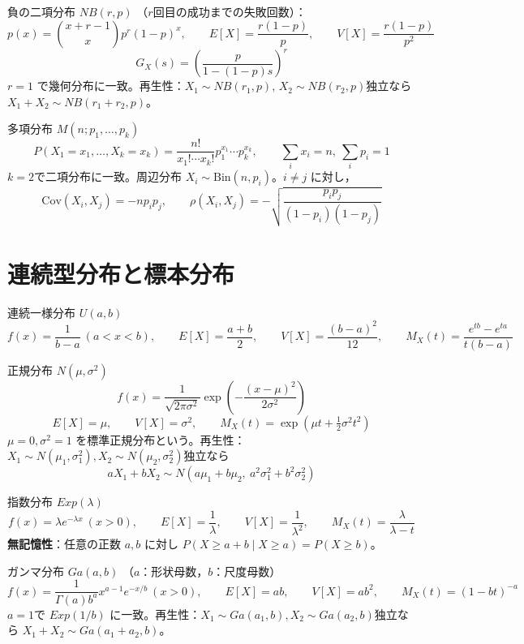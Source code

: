 \documentclass[a4paper,11pt]{ltjsarticle}
\newcommand{\Cov}{\mathrm{Cov}}
\begin{document}
\begin{term}{負の二項分布 $NB(r,p)$}
（$r$回目の成功までの失敗回数）：
\[
p(x)=\binom{x+r-1}{x}p^r(1-p)^x,
\qquad
E[X]=\frac{r(1-p)}{p},\qquad V[X]=\frac{r(1-p)}{p^2}
\]
\[
G_X(s)=\left(\frac{p}{1-(1-p)s}\right)^r
\]
$r=1$ で幾何分布に一致。再生性：$X_1\sim NB(r_1,p),\,X_2\sim NB(r_2,p)$独立なら $X_1+X_2\sim NB(r_1+r_2,p)$。
\end{term}

\begin{term}{多項分布 $M(n;p_1,\dots,p_k)$}
\[
P(X_1=x_1,\dots,X_k=x_k) = \frac{n!}{x_1!\cdots x_k!}p_1^{x_1}\cdots p_k^{x_k},
\qquad \sum_i x_i=n,\ \sum_i p_i=1
\]
$k=2$で二項分布に一致。周辺分布 $X_i\sim\mathrm{Bin}(n,p_i)$。$i\ne j$ に対し，
\[
\Cov(X_i,X_j) = -np_ip_j,\qquad
\rho(X_i,X_j) = -\sqrt{\frac{p_ip_j}{(1-p_i)(1-p_j)}}
\]
\end{term}

\section{連続型分布と標本分布}

\begin{term}{連続一様分布 $U(a,b)$}
\[
f(x)=\frac{1}{b-a}\ (a<x<b),\qquad
E[X]=\frac{a+b}{2},\qquad V[X]=\frac{(b-a)^2}{12},\qquad
M_X(t)=\frac{e^{tb}-e^{ta}}{t(b-a)}
\]
\end{term}

\begin{term}{正規分布 $N(\mu,\sigma^2)$}
\[
f(x)=\frac{1}{\sqrt{2\pi\sigma^2}}\exp\!\left(-\frac{(x-\mu)^2}{2\sigma^2}\right)
\]
\[
E[X]=\mu,\qquad V[X]=\sigma^2,\qquad M_X(t)=\exp\!\left(\mu t + \tfrac12\sigma^2t^2\right)
\]
$\mu=0,\sigma^2=1$ を標準正規分布という。再生性：$X_1\sim N(\mu_1,\sigma_1^2),X_2\sim N(\mu_2,\sigma_2^2)$独立なら
\[
aX_1+bX_2 \sim N(a\mu_1+b\mu_2,\ a^2\sigma_1^2+b^2\sigma_2^2)
\]
\end{term}

\begin{term}{指数分布 $Exp(\lambda)$}
\[
f(x)=\lambda e^{-\lambda x}\ (x>0),\qquad E[X]=\frac1\lambda,\qquad V[X]=\frac1{\lambda^2},\qquad M_X(t)=\frac{\lambda}{\lambda-t}
\]
\textbf{無記憶性}：任意の正数 $a,b$ に対し $P(X\ge a+b\mid X\ge a)=P(X\ge b)$。
\end{term}

\begin{term}{ガンマ分布 $Ga(a,b)$}
（$a$：形状母数，$b$：尺度母数）
\[
f(x)=\frac{1}{\Gamma(a)b^a}x^{a-1}e^{-x/b}\ (x>0),\qquad
E[X]=ab,\qquad V[X]=ab^2,\qquad M_X(t)=(1-bt)^{-a}
\]
$a=1$で $Exp(1/b)$ に一致。再生性：$X_1\sim Ga(a_1,b),X_2\sim Ga(a_2,b)$独立なら $X_1+X_2\sim Ga(a_1+a_2,b)$。
\end{term}
\end{document}
